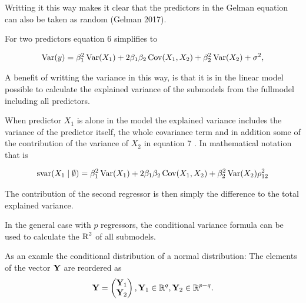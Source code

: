\documentclass[11pt,a4paper,twoside]{book}
\begin{document}
Writting it this way makes it clear that the predictors in the Gelman equation can also be taken as random (Gelman 2017). 

For two predictors equation 6 simplifies to

      \begin{align} 
        \operatorname{Var}(y) = \beta_{1}^2 \operatorname{Var}(X_{1}) + 2  \beta_{1}  \beta_{2} \operatorname{Cov}(X_{1}, X_{2}) + \beta_{2}^2 \operatorname{Var}(X_{2}) + \sigma^2, \label{eq:8} 
   \end{align}

 A benefit of writting the variance in this way, is that it is in the linear model possible to calculate the explained variance of the submodels from the fullmodel including all predictors.
 
 When predictor $X_{1}$ is alone in the model the explained variance includes the variance of the predictor itself, the whole covariance term and in addition some of the contribution of the variance of $X_{2}$ in equation 7 . In mathematical notation that is
 
      \begin{align} 
        \text{svar}({X_{1}} \mid \emptyset ) = \beta_{1}^2 \operatorname{Var}(X_{1}) + 2  \beta_{1}  \beta_{2} \operatorname{Cov}(X_{1}, X_{2}) + \beta_{2}^2 \operatorname{Var}(X_{2}) \rho_{12}^2 \label{eq:7} 
   \end{align}
   
The contribution of the second regressor is then simply the difference to the total explained variance. 

In the general case with $p$ regressors, the conditional variance formula can be used to calculate the $\text{R}^2$ of all submodels.  

As an examle the conditional distribution of a normal distribution:
The elements of the vector ${\mathbf{Y}}$ are reordered as
\begin{align*}
\mathbf{Y} = \begin{pmatrix}
\mathbf{Y}_{1} \\ 
\mathbf{Y}_{2} \end{pmatrix}, \mathbf{Y}_{1} \in {\mathbb{R}}^q, \mathbf{Y}_{2} \in {\mathbb{R}}^{p-q} .
\end{align*}
\end{document}
